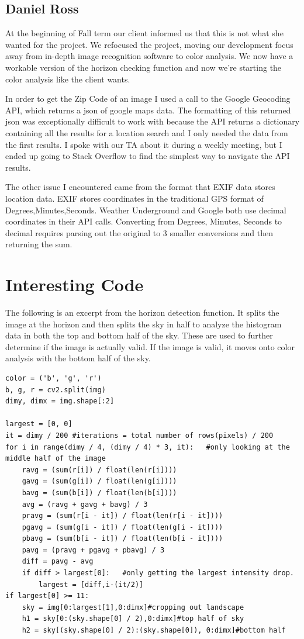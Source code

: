 \documentclass[onecolumn, draftclsnofoot,10pt, compsoc]{IEEEtran}
\begin{document}
\begin{singlespace}
		\subsection{Daniel Ross}
			At the beginning of Fall term our client informed us that this is not what she wanted for the project.
			We refocused the project, moving our development focus away from in-depth image recognition software to color analysis.
			We now have a workable version of the horizon checking function and now we're starting the color analysis like the client wants.

			In order to get the Zip Code of an image I used a call to the Google Geocoding API\cite{GoogleGeo}, which returns a json of google maps data.
			The formatting of this returned json was exceptionally difficult to work with because the API returns a dictionary containing all the results for a location search and I only needed the data from the first results.
			I spoke with our TA about it during a weekly meeting, but I ended up going to Stack Overflow to find the simplest way to navigate the API results.
			
			The other issue I encountered came from the format that EXIF data stores location data.
			EXIF stores coordinates in the traditional GPS format of Degrees,Minutes,Seconds.
			Weather Underground and Google both use decimal coordinates in their API calls.
			Converting from Degrees, Minutes, Seconds to decimal requires parsing out the original to 3 smaller conversions and then returning the sum.
	\section{Interesting Code}
		The following is an excerpt from the horizon detection function.
		It splits the image at the horizon and then splits the sky in half to analyze the histogram data in both the top and bottom half of the sky.
		These are used to further determine if the image is actually valid.
		If the image is valid, it moves onto color analysis with the bottom half of the sky.
		\begin{lstlisting}
color = ('b', 'g', 'r')
b, g, r = cv2.split(img)
dimy, dimx = img.shape[:2]

largest = [0, 0]
it = dimy / 200 #iterations = total number of rows(pixels) / 200
for i in range(dimy / 4, (dimy / 4) * 3, it):   #only looking at the middle half of the image
	ravg = (sum(r[i]) / float(len(r[i])))
	gavg = (sum(g[i]) / float(len(g[i])))
	bavg = (sum(b[i]) / float(len(b[i])))
	avg = (ravg + gavg + bavg) / 3
	pravg = (sum(r[i - it]) / float(len(r[i - it])))
	pgavg = (sum(g[i - it]) / float(len(g[i - it])))
	pbavg = (sum(b[i - it]) / float(len(b[i - it])))
	pavg = (pravg + pgavg + pbavg) / 3
	diff = pavg - avg
	if diff > largest[0]:   #only getting the largest intensity drop.
		largest = [diff,i-(it/2)]
if largest[0] >= 11:
	sky = img[0:largest[1],0:dimx]#cropping out landscape
	h1 = sky[0:(sky.shape[0] / 2),0:dimx]#top half of sky
	h2 = sky[(sky.shape[0] / 2):(sky.shape[0]), 0:dimx]#bottom half


\end{lstlisting}
\end{singlespace}
\end{document}
